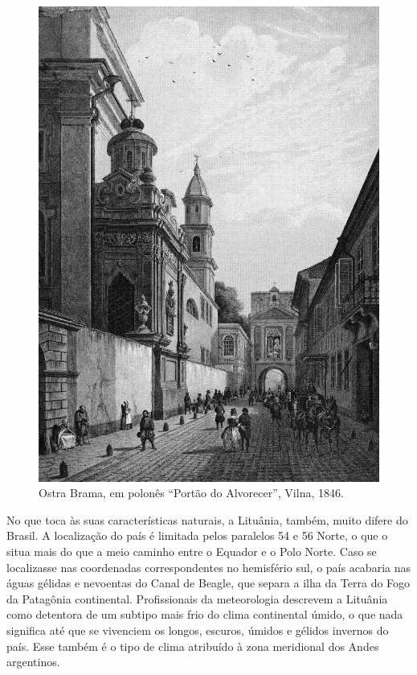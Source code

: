 \begin{figure}[!hp]
    \centering
    \includegraphics[width=\textwidth]{ilustra-02.png}
    \caption{Ostra Brama, em polonês ``Portão do Alvorecer'', Vilna, 1846.}
\end{figure}

No que toca às suas características naturais, a Lituânia, também, muito
difere do Brasil. A localização do país é limitada pelos paralelos 54 e
56 Norte, o que o situa mais do que a meio caminho entre o Equador e o
Polo Norte. Caso se localizasse nas coordenadas correspondentes no
hemisfério sul, o país acabaria nas águas gélidas e nevoentas do Canal
de Beagle, que separa a ilha da Terra do Fogo da Patagônia continental.
Profissionais da meteorologia descrevem a Lituânia como detentora de um
subtipo mais frio do clima continental úmido, o que nada significa até
que se vivenciem os longos, escuros, úmidos e gélidos invernos do país.
Esse também é o tipo de clima atribuído à zona meridional dos Andes
argentinos. 

